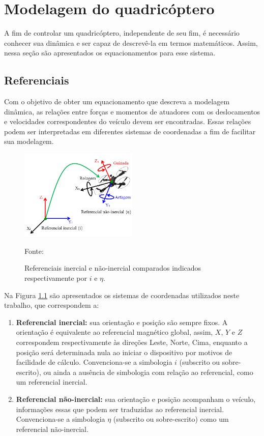 \documentclass[main.tex]{subfiles}
\begin{document}
\chapter{Modelagem do quadricóptero}
\label{chap:modelagem}

A fim de controlar um quadricóptero, independente de seu fim, é necessário conhecer sua dinâmica e ser capaz de descrevê-la em termos matemáticos. Assim, nessa seção são apresentados os equacionamentos para esse sistema.

\section{Referenciais}

Com o objetivo de obter um equacionamento que descreva a modelagem dinâmica, as relações entre forças e momentos de atuadores com os deslocamentos e velocidades correspondentes do veículo devem ser encontradas. Essas relações podem ser interpretadas em diferentes sistemas de coordenadas a fim de facilitar sua modelagem. 

\begin{figure}[!h]
	\centering
	\caption{Referenciais inercial e não-inercial comparados indicados respectivamente por $i$ e $\eta$.}
	\includegraphics[width=0.5\textwidth]{capitulos/modelagem/imgs/referenciais.png}
	\label{fig:referenciais}
	\begin{flushleft}
		\small{Fonte: \cite{imagem_referenciais}}
	\end{flushleft}
\end{figure}

Na Figura \ref{fig:referenciais} são apresentados os sistemas de coordenadas utilizados neste trabalho, que correspondem a:

\begin{enumerate}
    \item \textbf{Referencial inercial:} sua orientação e posição são sempre fixos. A orientação é equivalente ao referencial magnético global, assim, $X$, $Y$ e $Z$ correspondem respectivamente às direções Leste, Norte, Cima, enquanto a posição será determinada nula ao iniciar o dispositivo por motivos de facilidade de cálculo. Convenciona-se a simbologia $i$ (subscrito ou sobre-escrito), ou ainda a ausência de simbologia com relação ao referencial, como um referencial inercial.
    \item \textbf{Referencial não-inercial:} sua orientação e posição acompanham o veículo, informações essas que podem ser traduzidas ao referencial inercial. Convenciona-se a simbologia $\eta$ (subscrito ou sobre-escrito) como um referencial não-inercial.
\end{enumerate}
\end{document}
